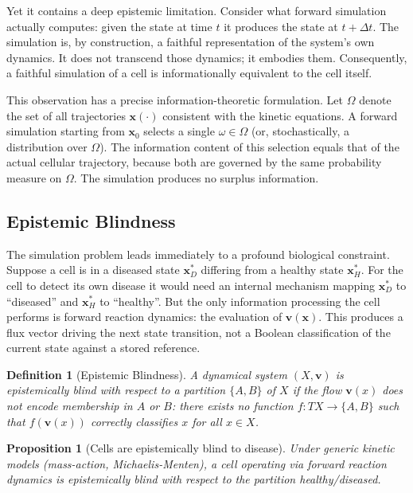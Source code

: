 \documentclass[twocolumn,10pt,a4paper]{article}
\newtheorem{proposition}[theorem]{Proposition}
\newtheorem{definition}[theorem]{Definition}
\begin{document}
Yet it contains a deep epistemic limitation.  Consider what forward simulation
actually computes: given the state at time $t$ it produces the state at
$t+\Delta t$.  The simulation is, by construction, a faithful representation
of the system's own dynamics.  It does not transcend those dynamics; it embodies
them.  Consequently, a faithful simulation of a cell is informationally
equivalent to the cell itself.

This observation has a precise information-theoretic formulation.  Let $\Omega$
denote the set of all trajectories $\mathbf{x}(\cdot)$ consistent with the
kinetic equations.  A forward simulation starting from $\mathbf{x}_0$ selects
a single $\omega\in\Omega$ (or, stochastically, a distribution over $\Omega$).
The information content of this selection equals that of the actual cellular
trajectory, because both are governed by the same probability measure on
$\Omega$.  The simulation produces no surplus information.

\subsection{Epistemic Blindness}
\label{sec:intro-blind}

The simulation problem leads immediately to a profound biological constraint.
Suppose a cell is in a diseased state $\mathbf{x}^*_D$ differing from a
healthy state $\mathbf{x}^*_H$.  For the cell to detect its own disease it
would need an internal mechanism mapping $\mathbf{x}^*_D$ to ``diseased'' and
$\mathbf{x}^*_H$ to ``healthy''.  But the only information processing the cell
performs is forward reaction dynamics: the evaluation of $\mathbf{v}(\mathbf{x})$.
This produces a flux vector driving the next state transition, not a Boolean
classification of the current state against a stored reference.

\begin{definition}[Epistemic Blindness]
\label{def:blind}
A dynamical system $(X,\mathbf{v})$ is \emph{epistemically blind} with respect
to a partition $\{A,B\}$ of $X$ if the flow $\mathbf{v}(x)$ does not encode
membership in $A$ or $B$: there exists no function $f:TX\to\{A,B\}$ such that
$f(\mathbf{v}(x))$ correctly classifies $x$ for all $x\in X$.
\end{definition}

\begin{proposition}[Cells are epistemically blind to disease]
\label{prop:blind}
Under generic kinetic models (mass-action, Michaelis-Menten), a cell operating
via forward reaction dynamics is epistemically blind with respect to the
partition \emph{healthy}/\emph{diseased}.
\end{proposition}
\end{document}
